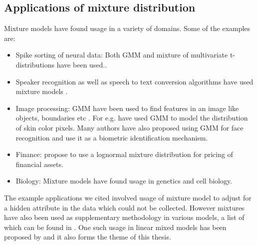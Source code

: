 \subsection{Applications of mixture distribution}
Mixture models have found usage in a variety of domains. Some of the examples are:
\begin{itemize}
\item Spike sorting of neural data: Both GMM and mixture of multivariate t-distributions have been used.\citep{lewicki_bayesian_1994,shoham_robust_2003}.
\item Speaker recognition as well as speech to text conversion algorithms have used mixture models \citep{simancas-acevedo_speaker_2001,xiang_efficient_2003,povey_subspace_2011}.
\item Image processing: GMM have been used to find features in an image like objects, boundaries etc \citep{fu_color_2012}. For e.g. \citet{ming-hsuan_yang_gaussian_1998} have used GMM to model the distribution of skin color pixels. Many authors have also proposed using GMM for face recognition and use it as a biometric identification mechanism.
\item Finance: \citet{brigo_lognormal-mixture_2002} propose to use a lognormal mixture distribution for pricing of financial assets.
\item Biology: Mixture models have found usage in genetics and cell biology.\citep{sim_evaluating_2012,gianola_mixture_2007} 
\end{itemize}

The example applications we cited involved usage of mixture model to adjust for a hidden attribute in the data which could not be collected. However mixtures have also been used as supplementary methodology in various models, a list of which can be found in \citet[pg. 238]{fruhwirth-schnatter_finite_2013}. One such usage in linear mixed models has been proposed by \citet{verbeke_linear_1996} and it also forms the theme of this thesis.\\

